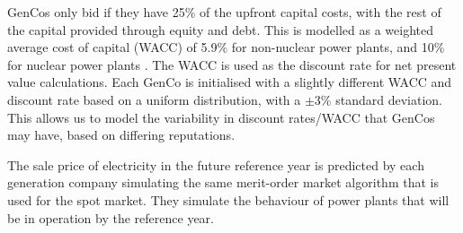 GenCos only bid if they have 25\% of the upfront capital costs, with the rest of the capital provided through equity and debt. This is modelled as a weighted average cost of capital (WACC) of 5.9\% for non-nuclear power plants, and 10\% for nuclear power plants \cite{KPMG2017, Paper2012}. The WACC is used as the discount rate for net present value calculations. Each GenCo is initialised with a slightly different WACC and discount rate based on a uniform distribution, with a $\pm$3\% standard deviation. This allows us to model the variability in discount rates/WACC that GenCos may have, based on differing reputations.

The sale price of electricity in the future reference year is predicted by each generation company simulating the same merit-order market algorithm that is used for the spot market. They simulate the behaviour of power plants that will be in operation by the reference year.


